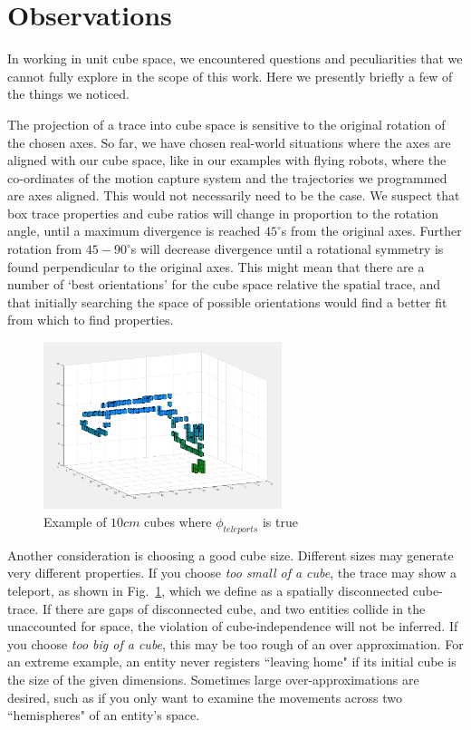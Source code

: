 \section{Observations}
\label{sec:observations}

In working in unit cube space, we encountered questions and peculiarities that we cannot fully explore in the scope of this work.  
Here we presently briefly a few of the things we noticed.

The projection of a trace into cube space is sensitive to the original rotation of the chosen axes.
So far, we have chosen real-world situations where the axes are aligned with our cube space, like in our examples with flying robots, where the co-ordinates of the motion capture system and the trajectories we programmed are axes aligned.
This would not necessarily need to be the case.
We suspect that box trace properties and cube ratios will change in proportion to the rotation angle, until a maximum divergence is reached $45^{\circ}$s from the original axes.
Further rotation from $45-90^{\circ}$s will decrease divergence until a rotational symmetry is found perpendicular to the original axes.
This might mean that there are a number of `best orientations' for the cube space relative the spatial trace, and that initially searching the space of possible orientations would find a better fit from which to find properties.

\begin{figure}
  \centering
  \includegraphics[width=0.62\textwidth]{./figures/cubesTooSmall.png}
  \caption{Example of $10cm$ cubes where $\phi_{teleports}$ is true}
  \label{fig:teleport}
\end{figure}

Another consideration is choosing a good cube size.  
Different sizes may generate very different properties.
 If you choose \emph{too small of a cube}, the trace may show a teleport, as shown in Fig.~\ref{fig:teleport}, which we define as a spatially disconnected cube-trace.
If there are gaps of disconnected cube, and two entities collide in the unaccounted for space, the violation of cube-independence will not be inferred.
 If you choose \emph{too big of a cube}, this may be too rough of an over approximation.
For an extreme example, an entity never registers ``leaving home" if its initial cube is the size of the given dimensions.
Sometimes large over-approximations are desired, such as if you only want to examine the movements across two ``hemispheres" of an entity's space.

